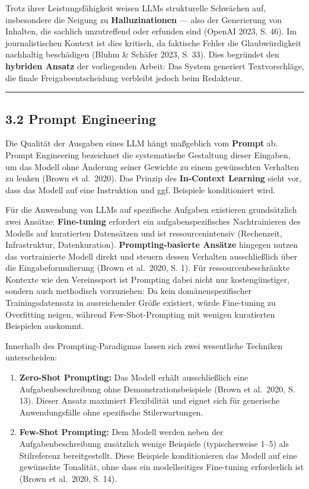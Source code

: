 Trotz ihrer Leistungsfähigkeit weisen LLMs strukturelle Schwächen auf,
insbesondere die Neigung zu \textbf{Halluzinationen} --- also der
Generierung von Inhalten, die sachlich unzutreffend oder erfunden sind
(OpenAI 2023, S. 46). Im journalistischen Kontext ist dies kritisch, da
faktische Fehler die Glaubwürdigkeit nachhaltig beschädigen (Bluhm \&
Schäfer 2023, S. 33). Dies begründet den \textbf{hybriden Ansatz} der
vorliegenden Arbeit: Das System generiert Textvorschläge, die finale
Freigabeentscheidung verbleibt jedoch beim Redakteur.

\begin{center}\rule{0.5\linewidth}{0.5pt}\end{center}

\subsection{3.2 Prompt Engineering}\label{prompt-engineering}

Die Qualität der Ausgaben eines LLM hängt maßgeblich vom \textbf{Prompt}
ab. Prompt Engineering bezeichnet die systematische Gestaltung dieser
Eingaben, um das Modell ohne Änderung seiner Gewichte zu einem
gewünschten Verhalten zu lenken (Brown et al.~2020). Das Prinzip des
\textbf{In-Context Learning} sieht vor, dass das Modell auf eine
Instruktion und ggf. Beispiele konditioniert wird.

Für die Anwendung von LLMs auf spezifische Aufgaben existieren
grundsätzlich zwei Ansätze: \textbf{Fine-tuning} erfordert ein
aufgabenspezifisches Nachtrainieren des Modells auf kuratierten
Datensätzen und ist ressourcenintensiv (Rechenzeit, Infrastruktur,
Datenkuration). \textbf{Prompting-basierte Ansätze} hingegen nutzen das
vortrainierte Modell direkt und steuern dessen Verhalten ausschließlich
über die Eingabeformulierung (Brown et al.~2020, S. 1). Für
ressourcenbeschränkte Kontexte wie den Vereinssport ist Prompting dabei
nicht nur kostengünstiger, sondern auch methodisch vorzuziehen: Da kein
domänenspezifischer Trainingsdatensatz in ausreichender Größe existiert,
würde Fine-tuning zu Overfitting neigen, während Few-Shot-Prompting mit
wenigen kuratierten Beispielen auskommt.

Innerhalb des Prompting-Paradigmas lassen sich zwei wesentliche
Techniken unterscheiden:

\begin{enumerate}
\def\labelenumi{\arabic{enumi}.}
\tightlist
\item
  \textbf{Zero-Shot Prompting:} Das Modell erhält ausschließlich eine
  Aufgabenbeschreibung ohne Demonstrationsbeispiele (Brown et al.~2020,
  S. 13). Dieser Ansatz maximiert Flexibilität und eignet sich für
  generische Anwendungsfälle ohne spezifische Stilerwartungen.
\item
  \textbf{Few-Shot Prompting:} Dem Modell werden neben der
  Aufgabenbeschreibung zusätzlich wenige Beispiele (typischerweise 1--5)
  als Stilreferenz bereitgestellt. Diese Beispiele konditionieren das
  Modell auf eine gewünschte Tonalität, ohne dass ein modellseitiges
  Fine-tuning erforderlich ist (Brown et al.~2020, S. 14).
\end{enumerate}

